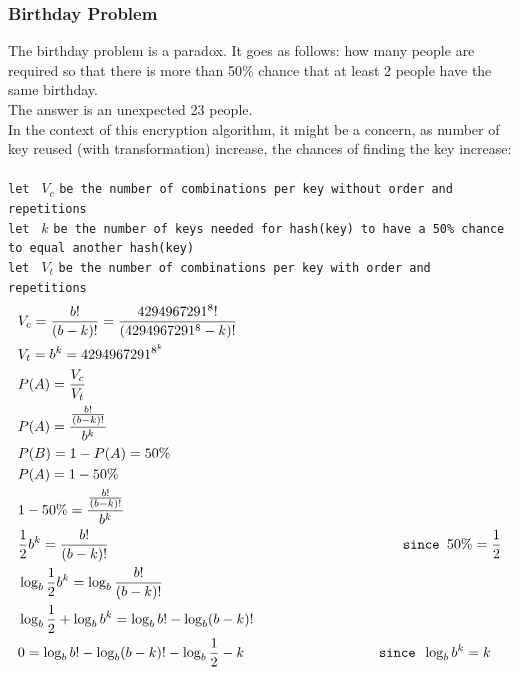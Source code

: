 \documentclass[fleqn, a4paper,12pt]{article}
\begin{document}
\subsubsection {Birthday Problem} \label{birthday_problem}

The birthday problem is a paradox. It goes as follows: how many people are required so that there is more than 50\% chance that at least 2 people have the same birthday.
\\
The answer is an unexpected 23 people.
\\
In the context of this encryption algorithm, it might be a concern, as number of key reused (with transformation) increase, the chances of finding the key increase:
\\
\\

\texttt{let } $V_c$ \texttt{be the number of combinations per key without order and repetitions} \\
\texttt{let } $k$ \texttt{be the number of keys needed for hash(key) to have a 50\% chance to equal another hash(key)} \\
\texttt{let } $V_t$ \texttt{be the number of combinations per key with order and repetitions} \\

\[
\begin{aligned}
&V_c = \frac{b!}{(b-k)!} = \frac{4294967291^8!}{(4294967291^8-k)!} \\
&V_t = b^k = 4294967291^{8^k} \\
&P(A) = \frac{V_c}{V_t} \\
&P(A) = \frac{\frac{b!}{(b-k)!}}{b^k} \\
&P(B) = 1- P(A) = 50\%\\
&P(A) = 1 - 50\%\\
&1 - 50\% = \frac{\frac{b!}{(b-k)!}}{b^k} \\
&\frac{1}{2}b^k =  \frac{b!}{(b-k)!} \hspace{7.2cm} \texttt{ since }50\% = \frac{1}{2} \\
&\log_b\frac{1}{2}b^k = \log_b\frac{b!}{(b-k)!} \\
&\log_b\frac{1}{2} + \log_bb^k = \log_bb! - \log_b(b-k)! \\
&0 = \log_bb! - \log_b(b-k)! - \log_b\frac{1}{2} - k \hspace{3.2cm} \texttt{ since }\log_bb^k = k\\
\end{aligned}
\]
\thispagestyle{empty} %
\end{document}

